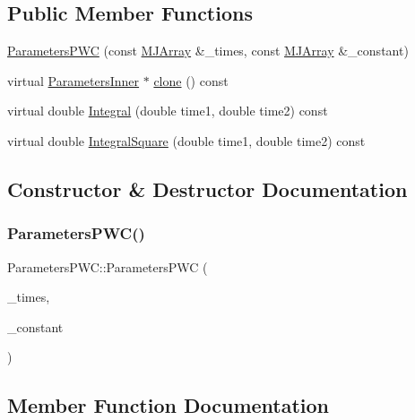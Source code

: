 \subsection*{Public Member Functions}
\begin{DoxyCompactItemize}
\item 
\hyperlink{classParametersPWC_ab2116663f6a0d95c79f8e6da1a33b9e4}{Parameters\+P\+WC} (const \hyperlink{classMJArray}{M\+J\+Array} \&\+\_\+times, const \hyperlink{classMJArray}{M\+J\+Array} \&\+\_\+constant)
\item 
virtual \hyperlink{classParametersInner}{Parameters\+Inner} $\ast$ \hyperlink{classParametersPWC_a14724b2321f515df6aef06b9badaf064}{clone} () const
\item 
virtual double \hyperlink{classParametersPWC_a42002b8d813dfaefe3a41f4a520ac6a6}{Integral} (double time1, double time2) const
\item 
virtual double \hyperlink{classParametersPWC_a3ab6b8a736641290561b5e8a748a6199}{Integral\+Square} (double time1, double time2) const
\end{DoxyCompactItemize}


\subsection{Constructor \& Destructor Documentation}
\hypertarget{classParametersPWC_ab2116663f6a0d95c79f8e6da1a33b9e4}{}\label{classParametersPWC_ab2116663f6a0d95c79f8e6da1a33b9e4} 
\subsubsection{\texorpdfstring{Parameters\+P\+W\+C()}{ParametersPWC()}}
{\footnotesize\ttfamily Parameters\+P\+W\+C\+::\+Parameters\+P\+WC (\begin{DoxyParamCaption}\item[{const \hyperlink{classMJArray}{M\+J\+Array} \&}]{\+\_\+times,  }\item[{const \hyperlink{classMJArray}{M\+J\+Array} \&}]{\+\_\+constant }\end{DoxyParamCaption})}



\subsection{Member Function Documentation}
\hypertarget{classParametersPWC_a14724b2321f515df6aef06b9badaf064}{}\label{classParametersPWC_a14724b2321f515df6aef06b9badaf064} 
